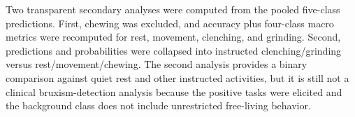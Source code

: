 \documentclass[pdflatex,sn-nature,iicol]{sn-jnl}
\begin{document}
Two transparent secondary analyses were computed from the pooled five-class predictions. First, chewing was excluded, and accuracy plus four-class macro metrics were recomputed for rest, movement, clenching, and grinding. Second, predictions and probabilities were collapsed into instructed clenching/grinding versus rest/movement/chewing. The second analysis provides a binary comparison against quiet rest and other instructed activities, but it is still not a clinical bruxism-detection analysis because the positive tasks were elicited and the background class does not include unrestricted free-living behavior.

\end{document}
